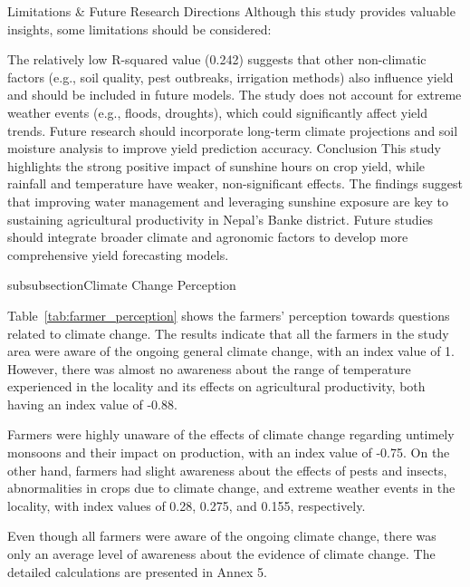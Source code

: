 Limitations \& Future Research Directions
Although this study provides valuable insights, some limitations should be considered:

The relatively low R-squared value (0.242) suggests that other non-climatic factors (e.g., soil quality, pest outbreaks, irrigation methods) also influence yield and should be included in future models.
The study does not account for extreme weather events (e.g., floods, droughts), which could significantly affect yield trends.
Future research should incorporate long-term climate projections and soil moisture analysis to improve yield prediction accuracy.
Conclusion
This study highlights the strong positive impact of sunshine hours on crop yield, while rainfall and temperature have weaker, non-significant effects. The findings suggest that improving water management and leveraging sunshine exposure are key to sustaining agricultural productivity in Nepal’s Banke district. Future studies should integrate broader climate and agronomic factors to develop more comprehensive yield forecasting models.


subsubsection{Climate Change Perception}

Table~\ref{tab:farmer_perception} shows the farmers' perception towards questions related to climate change. The results indicate that all the farmers in the study area were aware of the ongoing general climate change, with an index value of 1. However, there was almost no awareness about the range of temperature experienced in the locality and its effects on agricultural productivity, both having an index value of -0.88. 

Farmers were highly unaware of the effects of climate change regarding untimely monsoons and their impact on production, with an index value of -0.75. On the other hand, farmers had slight awareness about the effects of pests and insects, abnormalities in crops due to climate change, and extreme weather events in the locality, with index values of 0.28, 0.275, and 0.155, respectively. 

Even though all farmers were aware of the ongoing climate change, there was only an average level of awareness about the evidence of climate change. The detailed calculations are presented in Annex 5.

